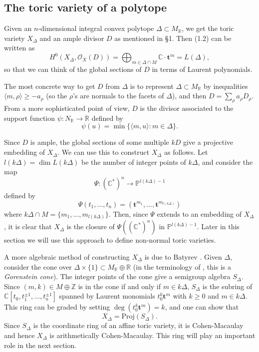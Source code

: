 \documentclass{amsart}
\theoremstyle{plain}
\theoremstyle{definition}
\begin{document}

	\subsection{The toric variety of a polytope} Given an
$n$-dimensional integral convex polytope $\Delta \subset M_{\mathbb{R}}$, we get the toric variety $X_\Delta$ and an ample divisor $D$ as
mentioned in \S1.  Then (1.2) can be written as
\begin{equation}
H^0(X_\Delta,\mathcal{O}_X(D)) = \bigoplus_{m\in \Delta\cap M} \mathbb{C}\cdot\mathbf{t}^m = L(\Delta),
\tag{5.1}\label{eq:5.1}
\end{equation}
so that we can think of the global sections of $D$ in terms of Laurent
polynomials.  

	The most concrete way to get $D$ from $\Delta$ is to represent
$\Delta \subset M_{\mathbb{R}}$ by inequalities $\langle m,\rho\rangle
\ge -a_\rho$ (so the $\rho$'s are normals to the facets of $\Delta$),
and then $D = \sum_\rho a_\rho D_\rho$.  From a more sophisticated
point of view, $D$ is the divisor associated to the support function
$\psi : N_{\mathbb{R}} \to \mathbb{R}$ defined by
\[
\psi(u) = \min\{\langle m,u\rangle : m \in \Delta\}.
\]

	Since $D$ is ample, the global sections of some multiple $kD$
give a projective embedding of $X_\Delta$.  We can use this to
construct $X_\Delta$ as follows.  Let $l(k\Delta) = \dim L(k\Delta)$
be the number of integer points of $k\Delta$, and consider the map
\[
\Psi : (\mathbb{C}^*)^n \longrightarrow \mathbb{P}^{l(k\Delta) - 1}
\]
defined by 
\begin{equation}
\Psi(t_1,\dots,t_n) =
(\mathbf{t}^{m_1},\dots,\mathbf{t}^{m_{l(k\Delta)}})
\tag{5.2}\label{eq:5.2}
\end{equation}
where $k\Delta\cap M = \{m_1,\dots,m_{l(k\Delta)}\}$.  Then, since
$\Psi$ extends to an embedding of $X_\Delta$, it is clear that
$X_\Delta$ is the closure of $\Psi((\mathbb{C}^*)^n)$ in $\mathbb{P}^{l(k\Delta) - 1}$.  Later in this section we will use this approach
to define non-normal toric varieties.

	A more algebraic method of constructing $X_\Delta$ is due to
Batyrev \cite{Bat4}.  Given $\Delta$, consider the cone over
$\Delta\times\{1\} \subset M_{\mathbb{R}}\oplus\mathbb{R}$ (in the
terminology of \cite{BB1}, this is a {\it Gorenstein cone\/}).  The
integer points of the cone give a semigroup algebra $S_\Delta$.  Since
$(m,k) \in M\oplus\mathbb{Z}$ is in the cone if and only if $m \in
k\Delta$, $S_\Delta$ is the subring of $\mathbb{C}[t_0,t_1^{\pm1},\dots,t_n^{\pm1}]$ spanned by Laurent monomials
$t_0^k\mathbf{t}^m$ with $k \ge 0$ and $m \in k\Delta$.  This ring can
be graded by setting $\deg(t_0^k\mathbf{t}^m) = k$, and one can show
that
\[
X_\Delta = \mathrm{Proj}(S_\Delta).
\]
Since $S_\Delta$ is the coordinate ring of an affine toric variety, it
is Cohen-Macaulay and hence $X_\Delta$ is arithmetically
Cohen-Macaulay.  This ring will play an important role in the next
section.
\end{document}
